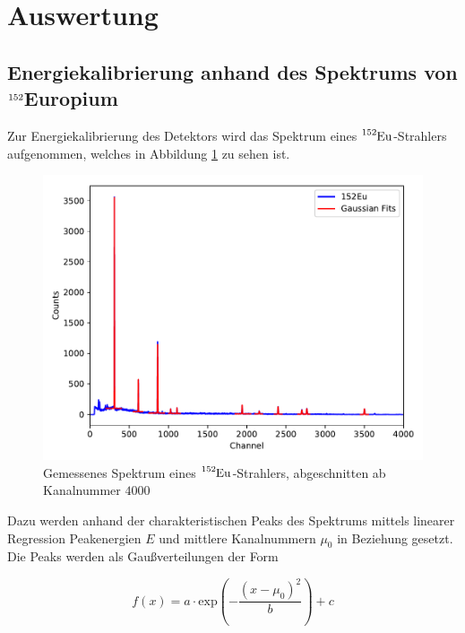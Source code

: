 \section{Auswertung}
\label{sec:Auswertung}


\subsection{Energiekalibrierung anhand des Spektrums von $\ce{^{152}}$Europium}

Zur Energiekalibrierung des Detektors wird das Spektrum eines $\ce{^{152}Eu}$-Strahlers aufgenommen, welches in Abbildung
\ref{fig:plot1} zu sehen ist.

\begin{figure}
  \centering
  \includegraphics{content/plot1.pdf}
  \caption{Gemessenes Spektrum eines $\ce{^{152}Eu}$-Strahlers, abgeschnitten ab Kanalnummer $\num{4000}$}
  \label{fig:plot1}
\end{figure}

Dazu werden anhand der charakteristischen Peaks des Spektrums mittels linearer Regression Peakenergien $E$ und mittlere 
Kanalnummern $\mu_0$ in Beziehung gesetzt.
Die Peaks werden als Gaußverteilungen der Form 

\begin{equation}
  f(x) = a \cdot \text{exp}\left( - \frac{(x-\mu_0)^2}{b}\right) + c
\end{equation}

